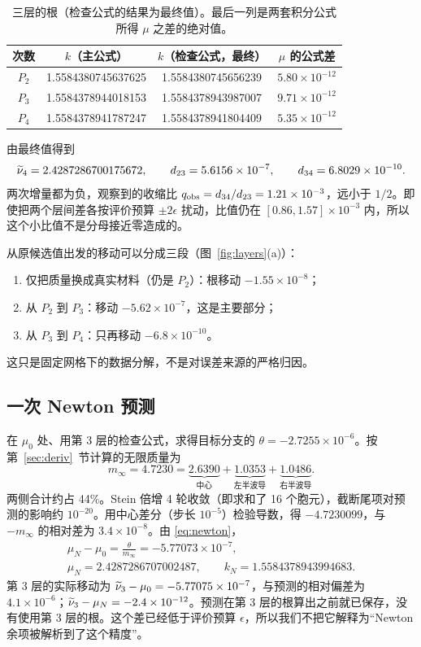 \documentclass[11pt,a4paper,fontset=fandol]{ctexart}
\begin{document}
\begin{table}[ht]
\centering
\caption{三层的根（检查公式的结果为最终值）。最后一列是两套积分公式所得 $\mu$ 之差的绝对值。}
\label{tab:roots}
\begin{tabular}{cccc}
\toprule
次数 & $k$（主公式） & $k$（检查公式，最终） & $\mu$ 的公式差 \\
\midrule
$P_2$ & 1.5584380745637625 & 1.5584380745656239 & $5.80\times10^{-12}$ \\
$P_3$ & 1.5584378944018153 & 1.5584378943987007 & $9.71\times10^{-12}$ \\
$P_4$ & 1.5584378941787247 & 1.5584378941804409 & $5.35\times10^{-12}$ \\
\bottomrule
\end{tabular}
\end{table}

由最终值得到
\[
\widetilde\nu_4=2.4287286700175672,\qquad d_{23}=5.6156\times10^{-7},\qquad d_{34}=6.8029\times10^{-10} .
\]
两次增量都为负，观察到的收缩比 $q_{\rm obs}=d_{34}/d_{23}=1.21\times10^{-3}$，远小于 $1/2$。即使把两个层间差各按评价预算 $\pm2\epsilon$ 扰动，比值仍在 $[0.86,1.57]\times10^{-3}$ 内，所以这个小比值不是分母接近零造成的。

从原候选值出发的移动可以分成三段（图~\ref{fig:layers}(a)）：
\begin{enumerate}
\item 仅把质量换成真实材料（仍是 $P_2$）：根移动 $-1.55\times10^{-8}$；
\item 从 $P_2$ 到 $P_3$：移动 $-5.62\times10^{-7}$，这是主要部分；
\item 从 $P_3$ 到 $P_4$：只再移动 $-6.8\times10^{-10}$。
\end{enumerate}
这只是固定网格下的数据分解，不是对误差来源的严格归因。

\subsection{一次 Newton 预测}

在 $\mu_0$ 处、用第 3 层的检查公式，求得目标分支的 $\theta=-2.7255\times10^{-6}$。按第~\ref{sec:deriv}~节计算的无限质量为
\[
m_\infty=4.7230=\underbrace{2.6390}_{\text{中心}}+\underbrace{1.0353}_{\text{左半波导}}+\underbrace{1.0486}_{\text{右半波导}} .
\]
两侧合计约占 44\%。Stein 倍增 4 轮收敛（即求和了 16 个胞元），截断尾项对预测的影响约 $10^{-20}$。用中心差分（步长 $10^{-5}$）检验导数，得 $-4.7230099$，与 $-m_\infty$ 的相对差为 $3.4\times10^{-8}$。由 \eqref{eq:newton}，
\[
\begin{gathered}
\mu_N-\mu_0=\frac{\theta}{m_\infty}=-5.77073\times10^{-7},\\
\mu_N=2.4287286707002487,\qquad k_N=1.5584378943994683 .
\end{gathered}
\]
第 3 层的实际移动为 $\widetilde\nu_3-\mu_0=-5.77075\times10^{-7}$，与预测的相对偏差为 $4.1\times10^{-6}$；$\widetilde\nu_3-\mu_N=-2.4\times10^{-12}$。预测在第 3 层的根算出之前就已保存，没有使用第 3 层的根。这个差已经低于评价预算 $\epsilon$，所以我们不把它解释为“Newton 余项被解析到了这个精度”。
\end{document}
